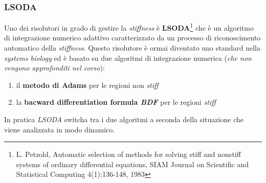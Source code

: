 \documentclass[a4paper,12pt, oneside]{book}
\begin{document}
\subsubsection{LSODA}
Uno dei risolutori in grado di gestire la \textit{stiffness} è
\textbf{LSODA}\footnote{L. Petzold, Automatic selection of methods for solving
  stiff and nonstiff systems of ordinary differential 
equations, SIAM Journal on Scientific and Statistical Computing 4(1):136-148,
1983}  che è un algoritmo di integrazione numerico adattivo caratterizzato da un
processo di riconoscimento automatico della \textit{stiffness}. Questo
risolutore è ormai diventato uno standard nella \textit{systems biology} ed è
basato su due algoritmi di integrazione numerica (\textit{che non vengono
  approfonditi nel corso}):
\begin{enumerate}
  \item il \textbf{metodo di Adams} per le regioni non \textit{stiff}
  \item la \textbf{bacward differentiation formula \textit{BDF}} per le regioni
  \textit{stiff} 
\end{enumerate}
In pratica \textit{LSODA} switcha tra i due algoritmi a seconda della
situazione che viene analizzata in modo dinamico.  
\end{document}
